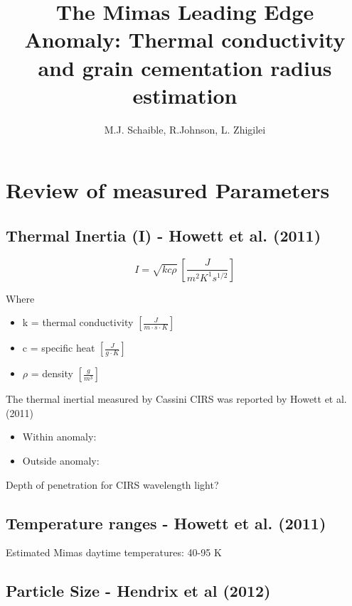 \documentclass[11pt]{article} %
\title{The Mimas Leading Edge Anomaly: Thermal conductivity and grain cementation radius estimation}
\author{M.J. Schaible, R.Johnson, L. Zhigilei}
\begin{document}
\maketitle

\section{Review of measured Parameters}
\label{sec:measured}

\subsection{Thermal Inertia (I) - Howett et al. (2011)}
\label{sec:inertia}

	\begin{equation}
	I = \sqrt{kc\rho} \: [\frac{J}{m^{2} K^{1} s^{1/2}}]
	\end{equation}

	\hspace{1cm}
	Where
	\begin{itemize}[leftmargin=3cm]
	\item k = thermal conductivity $[\frac{J}{m \cdot s \cdot K}]$
	\item c = specific heat $[\frac{J}{g \cdot K}]$
	\item $\rho$ = density $[\frac{g}{m^{3}}]$
	\end{itemize}

	The thermal inertial measured by Cassini CIRS was reported by Howett et al. (2011)
	\begin{itemize}
		\item Within anomaly: 
		\item Outside anomaly: 
	\end{itemize}
		
	Depth of penetration for CIRS wavelength light?
	
\subsection{Temperature ranges - Howett et al. (2011)}
\label{sec:temperature}

	Estimated Mimas daytime temperatures: 40-95 K
	
\subsection{Particle Size - Hendrix et al (2012)}
\label{sec:size}
\end{document}
